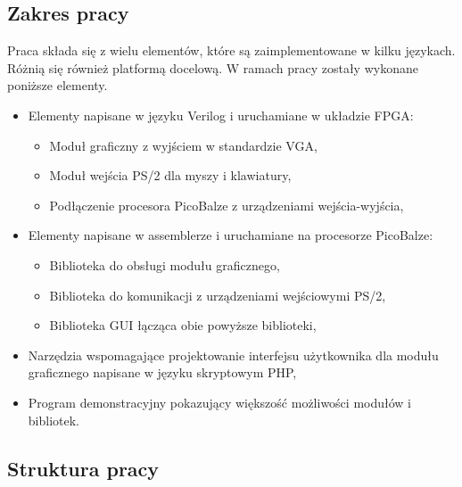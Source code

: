 \subsection{Zakres pracy}

Praca składa się z wielu elementów, które są zaimplementowane w kilku językach. Różnią się również platformą docelową. W ramach pracy zostały wykonane poniższe elementy.

\begin{itemize}
\item Elementy napisane w języku Verilog i uruchamiane w układzie FPGA:
\begin{itemize}
	\item Moduł graficzny z wyjściem w standardzie VGA,
	\item Moduł wejścia PS/2 dla myszy i klawiatury,
	\item Podłączenie procesora PicoBalze z urządzeniami wejścia-wyjścia,
\end{itemize}
\item Elementy napisane w assemblerze i uruchamiane na procesorze PicoBalze:
\begin{itemize}
	\item Biblioteka do obsługi modułu graficznego,
	\item Biblioteka do komunikacji z urządzeniami wejściowymi PS/2,
	\item Biblioteka GUI łącząca obie powyższe biblioteki,
\end{itemize}
\item Narzędzia wspomagające projektowanie interfejsu użytkownika dla modułu graficznego napisane w języku skryptowym PHP,
\item Program demonstracyjny pokazujący większość możliwości modułów i bibliotek.
\end{itemize}


\subsection{Struktura pracy}

